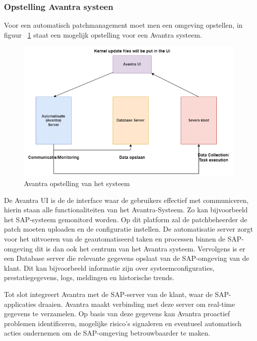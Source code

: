 \subsubsection{Opstelling Avantra systeen}
Voor een automatisch patchmanagement moet men een omgeving opstellen, in figuur ~\ref{fig:avantra4} staat een mogelijk opstelling voor een Avantra systeem. 
\begin{figure}[h]
    \centering
    \includegraphics[width=\textwidth]{avantra4.png}
    \caption{Avantra opstelling van het systeem}
     \label{fig:avantra4}
\end{figure}
\newpage

De Avantra UI is de de interface waar de gebruikers effectief met communiceren, hierin staan alle functionaliteiten van het Avantra-Systeem. Zo kan bijvoorbeeld het SAP-systeem gemonitord worden. Op
dit platform zal de patchbeheerder de patch moeten uploaden en de configuratie instellen. De automatisatie server zorgt voor het uitvoeren van de geautomatiseerd taken en processen binnen de SAP-omgeving dit is dan ook het centrum van het Avantra systeem.
Vervolgens is er een Database server die relevante gegevens opslaat van de SAP-omgeving van de klant. Dit kan bijvoorbeeld informatie zijn over systeemconfiguraties, prestatiegegevens, logs, meldingen en historische trends. 

Tot slot integreert Avantra met de SAP-server van de klant, waar de SAP-applicaties draaien. Avantra maakt verbinding met deze server om real-time gegevens te verzamelen.
Op basis van deze gegevens kan Avantra proactief problemen identificeren, mogelijke risico's signaleren en eventueel automatisch acties ondernemen om de SAP-omgeving betrouwbaarder te maken.




